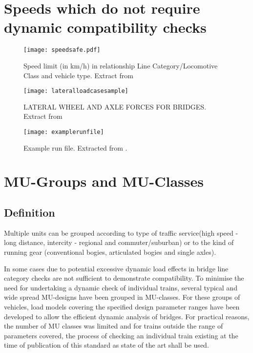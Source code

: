\begin{appendices}
\chapter{Speeds which do not require dynamic compatibility checks} \label{app:speedsafe}

\begin{figure}[h]
    \centering
    \texttt{[image: speedsafe.pdf]}
    \caption{Speed limit (in km/h) in relationship Line Category/Locomotive Class and vehicle type. Extract from \citet[Appendix F]{EC15528}}
\end{figure}


\begin{figure}[h]
    \centering
    \texttt{[image: lateralloadcasesample]}
    \caption{LATERAL WHEEL AND AXLE FORCES FOR BRIDGES. Extract from \citet[Fig 3.1]{d181}}
    \label{fig:lateralloadcasesample}
\end{figure}

\begin{figure}[h]
    \centering
    \texttt{[image: examplerunfile]}
    \caption{Example run file. Extracted from \citet{d181dt329}.  }
    \label{fig:examplerunfile}
\end{figure}

\chapter{MU-Groups and MU-Classes}\label{app:mu}

\section{Definition}
Multiple units can be grouped according to type of traffic service(high speed - long distance, intercity - regional and commuter/suburban) or to the kind of running gear (conventional bogies, articulated bogies and single axles).


In some cases due to potential excessive dynamic load effects in bridge line category checks are not sufficient to demonstrate compatibility. To minimise the need for undertaking a dynamic check of individual trains, several typical and wide spread MU-designs have been grouped in MU-classes. For these groups of vehicles, load models covering the specified design parameter ranges have been developed to allow the efficient dynamic analysis of bridges. For practical reasons, the number of MU classes was limited and for trains outside the range of parameters covered, the process of checking an individual train existing at the time of publication of this standard as state of the art shall be used.


\end{appendices}

